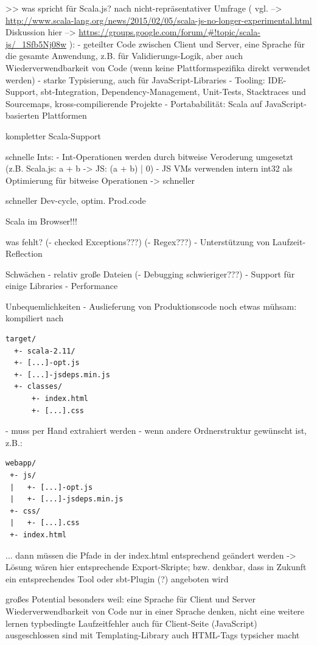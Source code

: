 \documentclass[a4paper, 12pt, hidelinks, listof=totoc, listoftables=totoc, bibliography=totoc]{scrreprt}
\begin{document}
>> was spricht für Scala.js?
    nach nicht-repräsentativer Umfrage (
      vgl.  -->  \url{http://www.scala-lang.org/news/2015/02/05/scala-js-no-longer-experimental.html}
      Diskussion hier  -->  \url{https://groups.google.com/forum/#!topic/scala-js/_1Sfb5Nj08w}
    ):
    - geteilter Code zwischen Client und Server, eine Sprache für die gesamte Anwendung, z.B. für Validierungs-Logik, aber auch Wiederverwendbarkeit von Code (wenn keine Plattformspezifika direkt verwendet werden)
    \cite{doeraene2013.CSJ}
    - starke Typisierung, auch für JavaScript-Libraries
    - Tooling: IDE-Support, sbt-Integration, Dependency-Management, Unit-Tests, Stacktraces und Sourcemaps, kross-compilierende Projekte
    - Portababilität: Scala auf JavaScript-basierten Plattformen

  kompletter Scala-Support
  
  schnelle Ints:
  - Int-Operationen werden durch bitweise Veroderung umgesetzt (z.B. Scala.js: a + b -> JS: (a + b) | 0)
  - JS VMs verwenden intern int32 als Optimierung für bitweise Operationen
  -> schneller\cite{doeraene2015.SSP}


  schneller Dev-cycle, optim. Prod.code
  
  Scala im Browser!!!
  
  
was fehlt?
  (- checked Exceptions???)
  (- Regex???)
  - Unterstützung von Laufzeit-Reflection

Schwächen
  - relativ große Dateien
  (- Debugging schwieriger???)
  - Support für einige Libraries
  - Performance
  
Unbequemlichkeiten
  - Auslieferung von Produktionscode noch etwas mühsam: kompiliert nach
\begin{lstlisting}
target/
  +- scala-2.11/
  +- [...]-opt.js
  +- [...]-jsdeps.min.js
  +- classes/
      +- index.html
      +- [...].css
\end{lstlisting}
  - muss per Hand extrahiert werden
  - wenn andere Ordnerstruktur gewünscht ist, z.B.:
\begin{lstlisting}
webapp/
 +- js/
 |   +- [...]-opt.js
 |   +- [...]-jsdeps.min.js
 +- css/
 |   +- [...].css
 +- index.html
\end{lstlisting}
  ... dann müssen die Pfade in der index.html entsprechend geändert werden
  -> Lösung wären hier entsprechende Export-Skripte; bzw. denkbar, dass in Zukunft ein entsprechendes Tool oder sbt-Plugin (?) angeboten wird



großes Potential
	besonders weil: eine Sprache für Client und Server
		Wiederverwendbarkeit von Code
		nur in einer Sprache denken, nicht eine weitere lernen
	typbedingte Laufzeitfehler auch für Client-Seite (JavaScript) ausgeschlossen sind
	mit Templating-Library auch HTML-Tags typsicher macht
	
\end{document}
